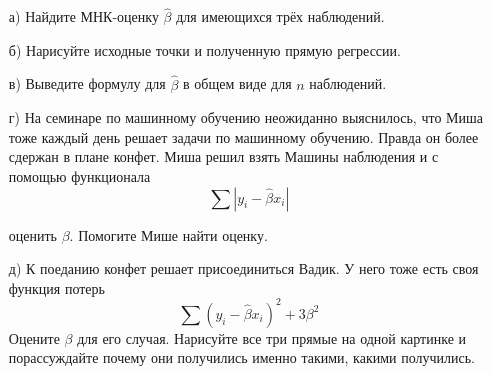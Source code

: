 \documentclass[12pt, a4paper, oneside]{article}
\begin{document}
\begin{enumerate}
	\item[а)] Найдите МНК-оценку $\hat \beta$ для имеющихся трёх наблюдений.
	\item[б)] Нарисуйте исходные точки и полученную прямую
	регрессии.
	\item[в)] Выведите формулу для $\hat \beta$ в общем виде для $n$ наблюдений.
	\item[г)] На семинаре по машинному обучению неожиданно выяснилось, что Миша тоже каждый день решает задачи по машинному обучению. Правда он более сдержан в плане конфет. Миша решил взять Машины наблюдения и с помощью функционала 
	\[
	\sum |y_i - \hat \beta x_i |
	\]  
	
	оценить $\beta$. Помогите Мише найти оценку. 
	\item[д)] К поеданию конфет решает присоединиться Вадик. У него тоже есть своя функция потерь
	\[
	\sum (y_i - \hat \beta x_i)^2 + 3\beta^2
	\]  	
	Оцените $\beta$ для его случая. Нарисуйте все три прямые на одной картинке и порассуждайте почему они получились именно такими, какими получились. 
\end{enumerate}
\end{document}
